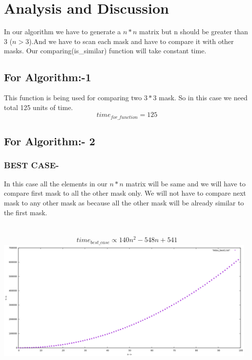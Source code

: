 \documentclass[conference]{IEEEtran}
\begin{document}
\section{\textbf{Analysis and Discussion}}
In our algorithm we have to generate a $n*n$ matrix but n should be greater than 3 ($ n>3 $).And we have to scan each mask and have to compare it with other masks. Our comparing(is\_similar) function will take constant time. 
\subsection{For Algorithm:-1}
This function is being used for comparing two $3*3$ mask. So in this case we need total 125 units of time.
\\ $$time_{for\_function}  = 125$$
\subsection{For Algorithm:- 2}
\subsubsection{\textbf{BEST CASE-}}
In this case all the elements in our $n*n$ matrix will be same and we will have to compare first mask to all the other mask only. We will not have to compare next mask to any other mask as because all the other mask will be already similar to the first mask.
\\\\\ $$time_{best\_case} \propto 140n^2-548n+541$$
\includegraphics[height =  6.00cm,width = \linewidth]{best.png}
\end{document}
